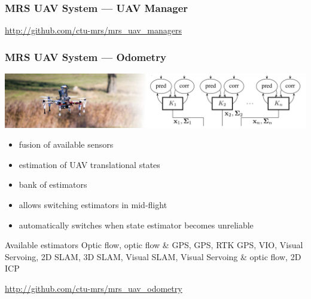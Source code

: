 \documentclass[aspectratio=1610]{beamer}
\begin{document}
  \begin{frame}
    \frametitle{MRS UAV System --- UAV Manager}


    \begin{block}{\cite{baca2020mrs}}
      \url{http://github.com/ctu-mrs/mrs_uav_managers}
    \end{block}

  \end{frame}



  \begin{frame}
    \frametitle{MRS UAV System --- Odometry}

    \vspace{-0.33em}

    \includegraphics[width=1.0\textwidth]{./fig/thumbnail_odometry.jpg}

    \vspace{-0.6em}

    \begin{itemize}
      \item fusion of available sensors
      \item estimation of UAV translational states
      \item bank of estimators
      \item allows switching estimators in mid-flight
      \item automatically switches when state estimator becomes unreliable
    \end{itemize}

    \begin{block}{Available estimators}
      Optic flow, optic flow \& GPS, GPS, RTK GPS, VIO, Visual Servoing, 2D SLAM, 3D SLAM, Visual SLAM, Visual Servoing \& optic flow, 2D ICP
    \end{block}

    \begin{block}{\cite{baca2020mrs}}
      \url{http://github.com/ctu-mrs/mrs_uav_odometry}
    \end{block}

  \end{frame}
\end{document}
